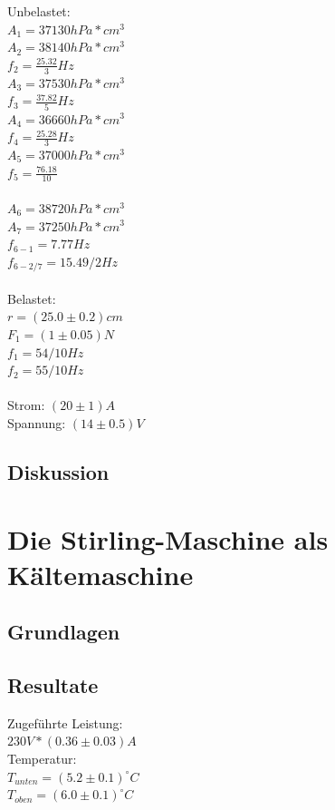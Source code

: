 \documentclass[12pt,a4paper]{article}
\begin{document}
\begin{multicols}{2}
Unbelastet:\\
$A_1 = 37130 hPa*cm^3$\\
$A_2 = 38140 hPa*cm^3$\\
$f_2 = \frac{25.32}{3} Hz$\\
$A_3 = 37530 hPa *cm^3$\\
$f_3 = \frac{37.82}{5} Hz$\\
$A_4 = 36660 hPa * cm^3$\\
$f_4 = \frac{25.28}{3} Hz$\\
$A_5 = 37000 hPa * cm^3$\\
$f_5 = \frac{76.18}{10}$\\
\\
$A_6 = 38720  hPa * cm^3$\\
$A_7 = 37250  hPa * cm^3$\\
$f_{6-1} = 7.77 Hz$\\
$f_{6-2 / 7} = 15.49 / 2 Hz$\\
\\
Belastet:\\
$r = (25.0 \pm 0.2)cm$\\
$F_1 = (1 \pm 0.05)N$\\
$f_1 = 54 / 10Hz$\\
$f_2 = 55 / 10Hz$\\
\\
Strom: $(20 \pm 1) A$\\
Spannung: $(14 \pm 0.5) V$\\

\subsection{Diskussion}




\section{Die Stirling-Maschine als Kältemaschine}

\subsection{Grundlagen}


\subsection{Resultate}

Zugeführte Leistung:\\
$230V * (0.36 \pm 0.03) A$\\
Temperatur:\\ 
$T_{unten} = (5.2 \pm 0.1)^{\circ}C$\\
$T_{oben} = (6.0 \pm 0.1)^{\circ}C$\\


\end{multicols}
\end{document}
